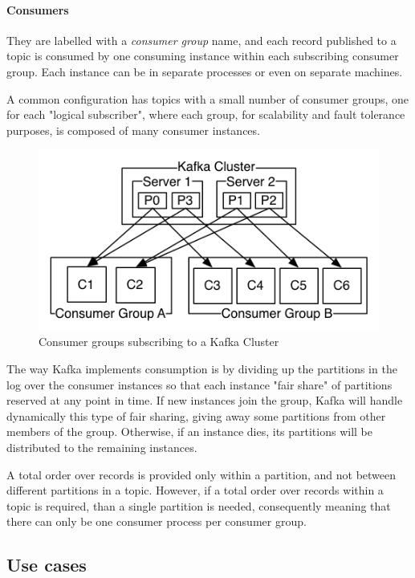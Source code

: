 \paragraph{Consumers} They are labelled with a \textit{consumer group} name, and each record published to a topic is consumed by one consuming instance within each subscribing consumer group. Each instance can be in separate processes or even on separate machines.

A common configuration has topics with a small number of consumer groups, one for each "logical subscriber", where each group, for scalability and fault tolerance purposes, is composed of many consumer instances.

\begin{figure}[h]
    \centering
    \includegraphics[width=0.7\linewidth]{Figures/consumer-groups}
    \caption[Consumer groups subscribing to a Kafka Cluster]{Consumer groups subscribing to a Kafka Cluster}
    \label{fig:consumer-groups}
\end{figure}


The way Kafka implements consumption is by dividing up the partitions in the log over the consumer instances so that each instance "fair share" of partitions reserved at any point in time. If new instances join the group, Kafka will handle dynamically this type of fair sharing, giving away some partitions from other members of the group. Otherwise, if an instance dies, its partitions will be distributed to the remaining instances.

A total order over records is provided only within a partition, and not between different partitions in a topic. However, if a total order over records within a topic is required, than a single partition is needed, consequently meaning that there can only be one consumer process per consumer group. 

\subsection{Use cases}

